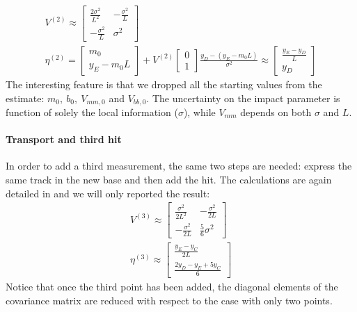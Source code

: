 \documentclass[12pt,a4paper,openright, oneside, titlepage]{book} %
\begin{document}
\begin{equation}
\begin{gathered}
V^{(2)}\approx
\begin{bmatrix}
\frac{2\sigma^2}{L^2} & -\frac{\sigma^2}{L} \\
-\frac{\sigma^2}{L} & \sigma^2
\end{bmatrix}\\
\eta^{(2)} = 
\begin{bmatrix} m_0 \\  y_E-m_0L \end{bmatrix} +
V^{(2)}
\begin{bmatrix} 0\\1 \end{bmatrix}
\frac{y_D-(y_E-m_0L)}{\sigma^2} \approx
\begin{bmatrix} \frac{y_E-y_D}{L} \\ y_D\end{bmatrix}
\end{gathered}
\label{eq_V2}
\end{equation}
The interesting feature is that we dropped all the starting values from the estimate: $m_0,\ b_0,\ V_{mm,0}$ and $V_{bb,0}$. 
The uncertainty on the impact parameter is function of solely the local information ($\sigma$), 
while $V_{mm}$ depends on both $\sigma$ and $L$. 

\paragraph{Transport and third hit} 
In order to add a third measurement, the same two steps are needed: 
express the same track in the new base and then add the hit. 
The calculations are again detailed in \cite{KutschkePaper} and we will only reported the result:
\begin{gather*}
V^{(3)}\approx
\begin{bmatrix}
\frac{\sigma^2}{2L^2} & -\frac{\sigma^2}{2L} \\
-\frac{\sigma^2}{2L} & \frac{5}{6}\sigma^2
\end{bmatrix}\\
\eta^{(3)} \approx
\begin{bmatrix} \frac{y_E-y_C}{2L} \\ \frac{2y_D-y_E+5y_C}{6}
\end{bmatrix}
\end{gather*}
Notice that once the third point has been added, 
the diagonal elements of the covariance matrix are reduced with respect to the case with only two points. 
\end{document}
